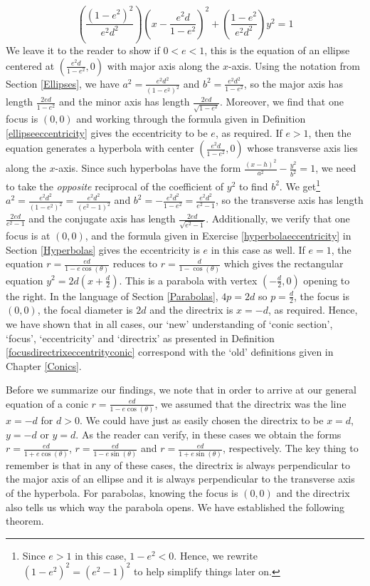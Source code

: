 \[ \left( \frac{\left(1-e^2\right)^2}{e^2d^2}\right) \left(x - \dfrac{e^2 d}{1-e^2}\right)^2 + \left(\frac{1-e^2}{e^2d^2}\right) y^2 = 1\]
\vspace{-.1in}
We leave it to the reader to show if $0 < e < 1$, this is the equation of an ellipse centered at  $\left(\frac{e^2 d}{1-e^2}, 0\right)$ with major axis along the $x$-axis. Using the notation from Section \ref{Ellipses}, we have $a^2 = \frac{e^2 d^2}{\left(1-e^2\right)^2}$ and $b^2 = \frac{e^2 d^2}{1-e^2}$, so the major axis has length $\frac{2ed}{1-e^2}$ and the minor axis has length $\frac{2ed}{\sqrt{1-e^2}}$.  Moreover, we find that one focus is $(0,0)$ and working through the formula given in  Definition \ref{ellipseeccentricity} gives the eccentricity to be $e$, as required.  If $e > 1$, then the equation generates a hyperbola with center $\left(\frac{e^2 d}{1-e^2}, 0\right)$ whose transverse axis lies along the $x$-axis.  Since such hyperbolas have the form $\frac{(x-h)^2}{a^2} -\frac{y^2}{b^2} = 1$, we need to take the \textit{opposite} reciprocal of the coefficient of $y^2$ to find $b^2$. We get\footnote{Since $e>1$ in this case, $1 - e^2 < 0$.  Hence, we rewrite $\left(1-e^2\right)^2 = \left(e^2-1\right)^2$ to help simplify things later on.}  $a^2 = \frac{e^2 d^2}{\left(1-e^2\right)^2} = \frac{e^2d^2}{\left(e^2-1\right)^2}$ and  $b^2 = -\frac{e^2 d^2}{1-e^2} = \frac{e^2d^2}{e^2-1}$, so the transverse axis has length  $\frac{2ed}{e^2-1}$ and the conjugate axis has length $\frac{2ed}{\sqrt{e^2-1}}$.  Additionally, we verify that one focus is at $(0,0)$, and the formula given in Exercise \ref{hyperbolaeccentricity} in Section \ref{Hyperbolas} gives  the eccentricity is $e$ in this case as well. If $e=1$, the equation $r = \frac{ed}{1-e\cos(\theta)}$ reduces to $r = \frac{d}{1-\cos(\theta)}$ which gives the rectangular equation $y^2 = 2d\left(x + \frac{d}{2}\right)$.   This is a parabola with vertex $\left(-\frac{d}{2}, 0\right)$ opening to the right.  In the language of Section \ref{Parabolas}, $4p = 2d$ so $p = \frac{d}{2}$, the focus is $(0,0)$, the focal diameter is $2d$ and the directrix is $x = -d$, as required.  Hence, we have shown that in all cases, our `new' understanding  of `conic section', `focus', `eccentricity' and `directrix' as presented in Definition \ref{focusdirectrixeccentrityconic} correspond with the `old' definitions given in Chapter \ref{Conics}. 
 
\vspace{.1in}
Before we summarize our findings, we note that in order to arrive at our general equation of a conic $r = \frac{ed}{1-e\cos(\theta)}$, we assumed that the directrix was the line $x = -d$ for $d > 0$.  We could have just as easily chosen the directrix to be $x = d$, $y = -d$ or $y = d$.  As the reader can verify, in these cases we obtain the forms  $r = \frac{ed}{1+e\cos(\theta)}$,  $r = \frac{ed}{1-e\sin(\theta)}$ and  $r = \frac{ed}{1+e\sin(\theta)}$, respectively. The key thing to remember is that in any of these cases, the directrix is always perpendicular to the major axis of an ellipse and it is always perpendicular to the transverse axis of the hyperbola. For parabolas, knowing the focus is $(0,0)$ and the directrix also tells us which way the parabola opens.  We have established the following theorem.

